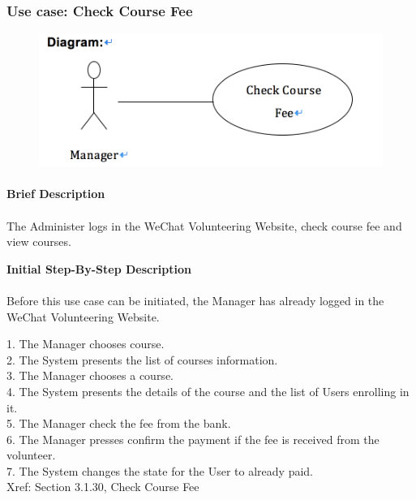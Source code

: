 \documentclass[12pt]{report}
\begin{document}
\newpage
\subsubsection{Use case:  Check Course Fee }

\begin{figure}[!htb]
  \includegraphics{216.PNG}
\end{figure}
\paragraph{}
\begin{flushleft}
\textbf{Brief Description }
\paragraph{}
The Administer logs in the WeChat Volunteering Website, check course fee and view courses.\\

\begin{flushleft}
\textbf{Initial Step-By-Step Description }
\paragraph{}
Before this use case can be initiated, the Manager has already logged in the WeChat Volunteering Website.

\begin{flushleft}
1.	The Manager chooses course. \\
2.	The System presents the list of courses information.  \\
3.	The Manager chooses a course.\\
4.	The System presents the details of the course and the list of Users enrolling in it. \\
5.	The Manager check the fee from the bank. \\
6.	The Manager presses confirm the payment if the fee is received from the volunteer. \\
7.	The System changes the state for the User to already paid. \\
Xref: Section 3.1.30, Check Course Fee
\end{flushleft}
\end{flushleft}
\end{flushleft}
\end{document}
